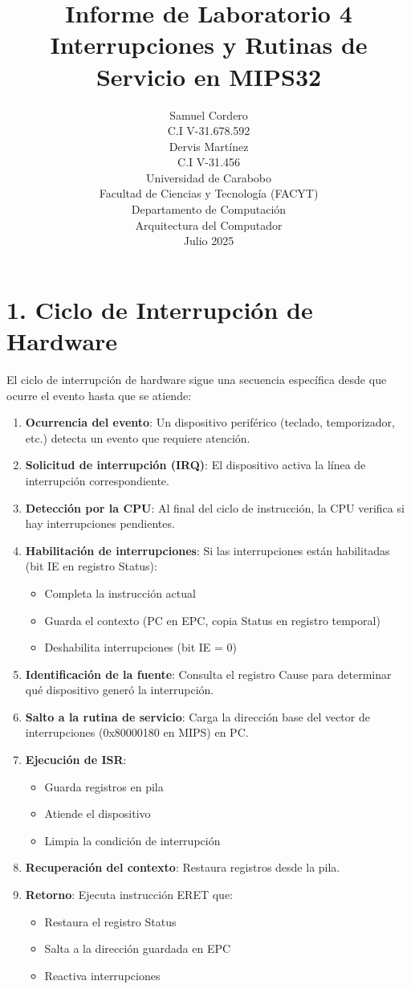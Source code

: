 \documentclass[12pt]{article}
\title{\textbf{Informe de Laboratorio 4 \\ Interrupciones y Rutinas de Servicio en MIPS32}}
\author{
    Samuel Cordero \\ C.I V-31.678.592 \\
    Dervis Martínez \\ C.I V-31.456 \\
    \vspace{1cm}
    Universidad de Carabobo \\
    Facultad de Ciencias y Tecnología (FACYT) \\
    Departamento de Computación \\
    Arquitectura del Computador \\
    Julio 2025
}
\date{}
\begin{document}
\maketitle

\section*{1. Ciclo de Interrupción de Hardware}
El ciclo de interrupción de hardware sigue una secuencia específica desde que ocurre el evento hasta que se atiende:

\begin{enumerate}
    \item \textbf{Ocurrencia del evento}: Un dispositivo periférico (teclado, temporizador, etc.) detecta un evento que requiere atención.
    \item \textbf{Solicitud de interrupción (IRQ)}: El dispositivo activa la línea de interrupción correspondiente.
    \item \textbf{Detección por la CPU}: Al final del ciclo de instrucción, la CPU verifica si hay interrupciones pendientes.
    \item \textbf{Habilitación de interrupciones}: Si las interrupciones están habilitadas (bit IE en registro Status):
    \begin{itemize}
        \item Completa la instrucción actual
        \item Guarda el contexto (PC en EPC, copia Status en registro temporal)
        \item Deshabilita interrupciones (bit IE = 0)
    \end{itemize}
    \item \textbf{Identificación de la fuente}: Consulta el registro Cause para determinar qué dispositivo generó la interrupción.
    \item \textbf{Salto a la rutina de servicio}: Carga la dirección base del vector de interrupciones (0x80000180 en MIPS) en PC.
    \item \textbf{Ejecución de ISR}: 
    \begin{itemize}
        \item Guarda registros en pila
        \item Atiende el dispositivo
        \item Limpia la condición de interrupción
    \end{itemize}
    \item \textbf{Recuperación del contexto}: Restaura registros desde la pila.
    \item \textbf{Retorno}: Ejecuta instrucción ERET que:
    \begin{itemize}
        \item Restaura el registro Status
        \item Salta a la dirección guardada en EPC
        \item Reactiva interrupciones
    \end{itemize}
\end{enumerate}
\end{document}
